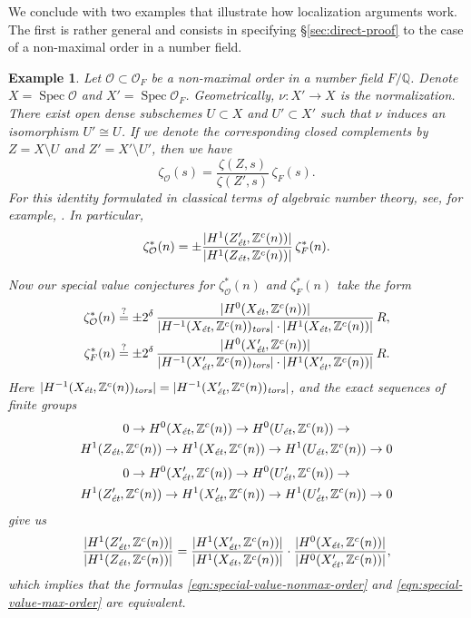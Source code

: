 \documentclass{article}
\DeclareMathOperator{\Spec}{Spec}
\newcommand{\QQ}{\mathbb{Q}}
\newcommand{\ZZ}{\mathbb{Z}}
\newcommand{\et}{\text{\it \'{e}t}}
\newcommand{\tors}{\text{\it tors}}
\theoremstyle{myplain}
\theoremstyle{mydefinition}
\newtheorem{example}[theorem]{Example}
\begin{document}
We conclude with two examples that illustrate how localization arguments
work. The first is rather general and consists in specifying
\S\ref{sec:direct-proof} to the case of a non-maximal order in a number field.

\begin{example}
  Let $\mathcal{O} \subset \mathcal{O}_F$ be a non-maximal order in a number
  field $F/\QQ$. Denote $X = \Spec \mathcal{O}$ and
  $X' = \Spec \mathcal{O}_F$. Geometrically, $\nu\colon X' \to X$ is the
  normalization. There exist open dense subschemes $U \subset X$ and
  $U' \subset X'$ such that $\nu$ induces an isomorphism $U' \cong U$. If we
  denote the corresponding closed complements by $Z = X\setminus U$ and
  $Z' = X'\setminus U'$, then we have
  $$\zeta_\mathcal{O} (s) = \frac{\zeta (Z,s)}{\zeta (Z',s)}\,\zeta_F (s).$$
  For this identity formulated in classical terms of algebraic number theory,
  see, for example, \cite{Jenner-1969}. In particular,
  \[ \zeta^*_\mathcal{O} (n) =
    \pm \frac{|H^1 (Z'_\et, \ZZ^c(n))|}{|H^1 (Z_\et, \ZZ^c(n))|}\,\zeta^*_F (n). \]

  Now our special value conjectures for $\zeta^*_\mathcal{O} (n)$ and
  $\zeta^*_F (n)$ take the form
  \begin{align}
    \label{eqn:special-value-nonmax-order}
    \zeta^*_\mathcal{O} (n) & \stackrel{?}{=}
                              \pm 2^\delta\,\frac{|H^0 (X_\et, \ZZ^c (n))|}{|H^{-1} (X_\et, \ZZ^c (n))_\tors|\cdot |H^1 (X_\et, \ZZ^c (n))|}\,R, \\
    \label{eqn:special-value-max-order}
    \zeta^*_F (n) & \stackrel{?}{=}
                    \pm 2^\delta\,\frac{|H^0 (X'_\et, \ZZ^c (n))|}{|H^{-1} (X'_\et, \ZZ^c (n))_\tors|\cdot |H^1 (X'_\et, \ZZ^c (n))|}\,R.
  \end{align}
  Here
  $|H^{-1} (X_\et, \ZZ^c (n))_\tors| = |H^{-1} (X'_\et, \ZZ^c (n))_\tors|$, and
  the exact sequences of finite groups
  \begin{multline*}
    0 \to H^0 (X_\et, \ZZ^c (n)) \to H^0 (U_\et, \ZZ^c (n)) \to \\
    H^1 (Z_\et, \ZZ^c (n)) \to H^1 (X_\et, \ZZ^c (n)) \to H^1 (U_\et, \ZZ^c (n)) \to 0
  \end{multline*}
  \begin{multline*}
    0 \to H^0 (X'_\et, \ZZ^c (n)) \to H^0 (U'_\et, \ZZ^c (n)) \to \\
    H^1 (Z'_\et, \ZZ^c (n)) \to H^1 (X'_\et, \ZZ^c (n)) \to H^1 (U'_\et, \ZZ^c (n)) \to 0
  \end{multline*}
  give us
  \[ \frac{|H^1 (Z'_\et, \ZZ^c (n))|}{|H^1 (Z_\et, \ZZ^c (n))|} =
    \frac{|H^1 (X'_\et, \ZZ^c (n))|}{|H^1 (X_\et, \ZZ^c (n))|}\cdot
    \frac{|H^0 (X_\et, \ZZ^c (n))|}{|H^0 (X'_\et, \ZZ^c (n))|}, \]
  which implies that the formulas \eqref{eqn:special-value-nonmax-order} and
  \eqref{eqn:special-value-max-order} are equivalent.
\end{example}
\end{document}
